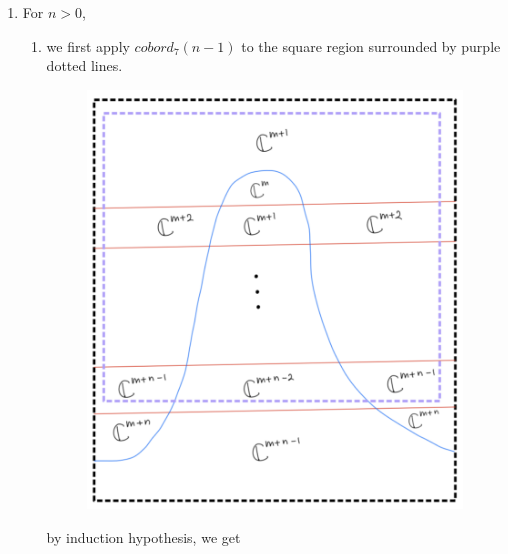 \begin{enumerate}[label=(\roman*)]
\item For $n>0$,
\begin{enumerate}[label=(Step \arabic*)]
\item we first apply $cobord_7(n-1)$ to the square region surrounded by purple dotted lines.

\begin{figure}[H]
    \centering
    \includegraphics[scale = 0.95]{diagrams/cobord7/4.png}
    \caption{}
    \label{fig:your-label}
\end{figure}

by induction hypothesis, we get


\end{enumerate}
\end{enumerate}

